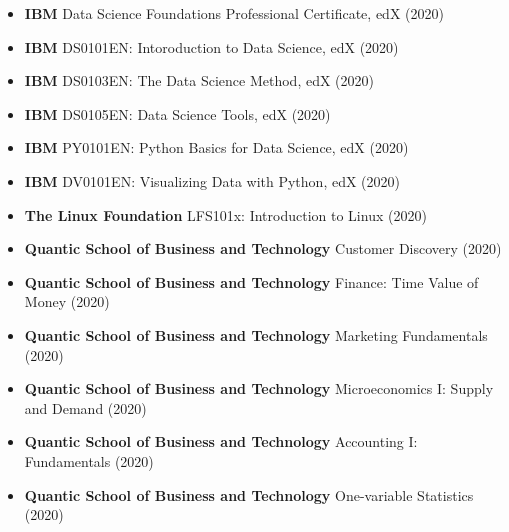 \documentclass[11pt,letterpaper,sans]{moderncv} %
\begin{document}
\begin{itemize}

	\item \textbf{IBM} Data Science Foundations Professional Certificate, edX (2020)
	\item \textbf{IBM} DS0101EN: Intoroduction to Data Science, edX (2020)
	\item \textbf{IBM} DS0103EN: The Data Science Method, edX (2020)
	\item \textbf{IBM} DS0105EN: Data Science Tools, edX (2020)
	\item \textbf{IBM} PY0101EN: Python Basics for Data Science, edX (2020)
	\item \textbf{IBM} DV0101EN: Visualizing Data with Python, edX (2020)
	\item \textbf{The Linux Foundation} LFS101x: Introduction to Linux (2020)
	\item \textbf{Quantic School of Business and Technology} Customer Discovery (2020)
	\item \textbf{Quantic School of Business and Technology} Finance: Time Value of Money (2020)
        \item \textbf{Quantic School of Business and Technology} Marketing Fundamentals (2020)
	\item \textbf{Quantic School of Business and Technology} Microeconomics I: 
								   Supply and Demand (2020)
	\item \textbf{Quantic School of Business and Technology} Accounting I: Fundamentals (2020)
	\item \textbf{Quantic School of Business and Technology} One-variable Statistics (2020)
	

\end{itemize}






\end{document}
